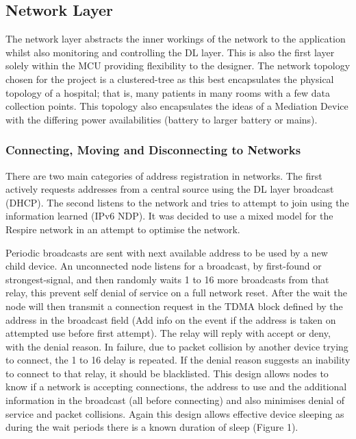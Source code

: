 \subsection{Network Layer}
The network layer abstracts the inner workings of the network to the application whilst also
monitoring and controlling the \ac{DL} layer. This is also the first layer solely within the \ac{MCU}
providing flexibility to the designer.
The network topology chosen for the project is a clustered-tree as this best encapsulates the
physical topology of a hospital; that is, many patients in many rooms with a few data collection
points. This topology also encapsulates the ideas of a Mediation Device with the differing power
availabilities (battery to larger battery or mains)\cite{Cuomo, Della Luna, Cipollone, Todorova, & Suihko,
2008}.

\subsubsection{Connecting, Moving and Disconnecting to Networks}
There are two main categories of address registration in networks. The first actively requests
addresses from a central source using the DL layer broadcast (\eg \ac{DHCP}). The second listens to the
network and tries to attempt to join using the information learned (\eg \ac{IPv6 NDP}). It was decided to
use a mixed model for the Respire network in an attempt to optimise the network.


Periodic broadcasts are sent with next available address to be used by a new child device. An
unconnected node listens for a broadcast, by first-found or strongest-signal, and then randomly
waits 1 to 16 more broadcasts from that relay, this prevent self denial of service on a full network
reset. After the wait the node will then transmit a connection request in the \ac{TDMA} block defined by
the address in the broadcast field (Add info on the event if the address is taken on attempted use
before first attempt). The relay will reply with accept or deny, with the denial reason. In failure, due
to packet collision by another device trying to connect, the 1 to 16 delay is repeated. If the denial
reason suggests an inability to connect to that relay, it should be blacklisted. This design allows
nodes to know if a network is accepting connections, the address to use and the additional
information in the broadcast (all before connecting) and also minimises denial of service and packet
collisions. Again this design allows effective device sleeping as during the wait periods there is a
known duration of sleep (Figure 1).


